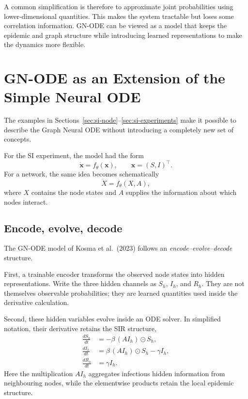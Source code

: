 \documentclass[11pt,a4paper]{article}
\begin{document}
A common simplification is therefore to approximate joint probabilities using
lower-dimensional quantities. This makes the system tractable but loses some
correlation information. GN-ODE can be viewed as a model that keeps the
epidemic and graph structure while introducing learned representations to make
the dynamics more flexible.

\section{GN-ODE as an Extension of the Simple Neural ODE}
\label{sec:gnode}

The examples in Sections~\ref{sec:si-node}--\ref{sec:si-experiments} make it
possible to describe the Graph Neural ODE without introducing a completely new
set of concepts.

For the SI experiment, the model had the form
\[
    \dot{\mathbf{x}}=f_\theta(\mathbf{x}),
    \qquad
    \mathbf{x}=(S,I)^\top.
\]
For a network, the same idea becomes schematically
\[
    \dot{X}=f_\theta(X,A),
\]
where $X$ contains the node states and $A$ supplies the information about which
nodes interact.


\subsection{Encode, evolve, decode}

The GN-ODE model of Kosma et al.\ (2023) follows an
\emph{encode--evolve--decode} structure.

First, a trainable encoder transforms the observed node states into hidden
representations. Write the three hidden channels as $S_h$, $I_h$, and $R_h$.
They are not themselves observable probabilities; they are learned quantities
used inside the derivative calculation.

Second, these hidden variables evolve inside an ODE solver. In simplified
notation, their derivative retains the SIR structure,
\begin{align}
    \frac{dS_h}{dt}
        &= -\beta\,(A I_h)\odot S_h,\\
    \frac{dI_h}{dt}
        &=  \beta\,(A I_h)\odot S_h-\gamma I_h,\\
    \frac{dR_h}{dt}
        &=  \gamma I_h.
    \label{eq:gnode-core}
\end{align}
Here the multiplication $A I_h$ aggregates infectious hidden information from
neighbouring nodes, while the elementwise products retain the local epidemic
structure.
\end{document}
